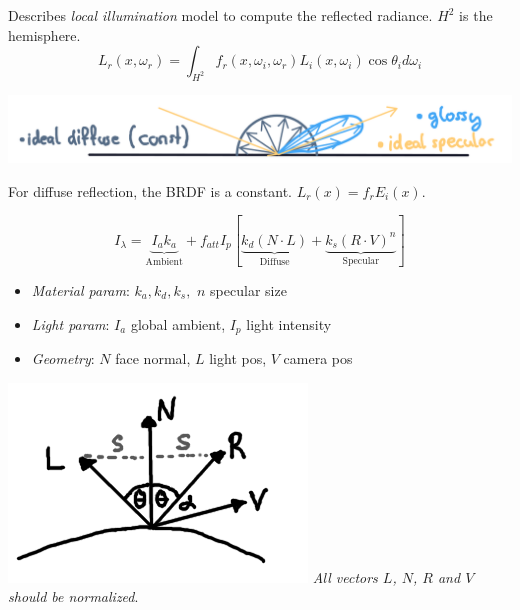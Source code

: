 \begin{definition}
  Describes \textit{local illumination} model to compute the reflected radiance. \(H^2\) is the hemisphere.
  \[L_r(x, \omega_r) = \int_{H^2}f_r(x, \omega_i, \omega_r)L_i(x, \omega_i) \cos \theta_i d \omega_i\]
\end{definition}

\includegraphics*[width=\linewidth]{assets/reflections.png}

\begin{definition}
  For diffuse reflection, the BRDF is a constant.
  \(L_r(x) = f_r E_i(x)\).
\end{definition}

\begin{algorithm}
  \[I_\lambda = \underbrace{I_a k_a}_{\text{Ambient}} + f_{att}I_p[\underbrace{k_d(N \cdot L)}_{\text{Diffuse}} + \underbrace{k_s(R \cdot V)^n}_{\text{Specular}}]\]
  \begin{itemize}
    \item \textit{Material param}: \(k_a, k_d, k_s,\) \(n\) specular size
    \item \textit{Light param}: \(I_a\) global ambient, \(I_p\) light intensity
    \item \textit{Geometry}: \(N\) face normal, \(L\) light pos, \(V\) camera pos
  \end{itemize}

  \vspace{-15pt}
  \begin{multicols}{2}
    \includegraphics*[width=\linewidth]{assets/phong_lighting.png}
    \textit{All vectors \(L\), \(N\), \(R\) and \(V\) should be normalized}.
  \end{multicols}
\end{algorithm}

